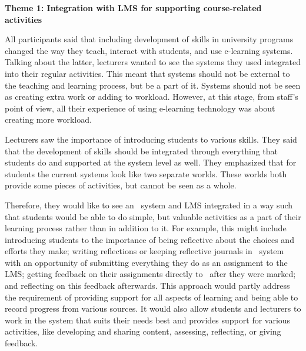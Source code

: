 \textbf{Theme 1: Integration with LMS for supporting course-related activities}

All participants said that including development of \LLLs skills in university
programs changed the way they teach, interact with students, and use e-learning
systems. Talking about the latter, lecturers wanted to see the systems they used
integrated into their regular activities. This meant that systems should not be
external to the teaching and learning process, but be a part of it. Systems
should not be seen as creating extra work or adding to workload. However, at
this stage, from staff's point of view, all their experience of using e-learning
technology was about creating more workload.


Lecturers saw the importance of introducing students to various \LLLs skills.
They said that the development of \LLLs skills should be integrated through
everything that students do and supported at the system level as well. They
emphasized that for students the current systems look like two separate worlds.
These worlds both provide some pieces of activities, but cannot be seen as a
whole.


Therefore, they would like to see an \ep~system and LMS integrated in a way
such that students would be able to do simple, but valuable activities as a part
of their learning process rather than in addition to it. For example, this might
include introducing students to the importance of being reflective about the
choices and efforts they make; writing reflections or keeping reflective
journals in \ep~system with an opportunity of submitting everything they do as
an assignment to the LMS; getting feedback on their assignments directly to
\ep~after they were marked; and reflecting on this feedback afterwards. This
approach would partly address the requirement of providing support for all
aspects of learning and being able to record progress from various sources. It
would also allow students and lecturers to work in the system that suits their
needs best and provides support for various activities, like developing and
sharing content, assessing, reflecting, or giving feedback.

